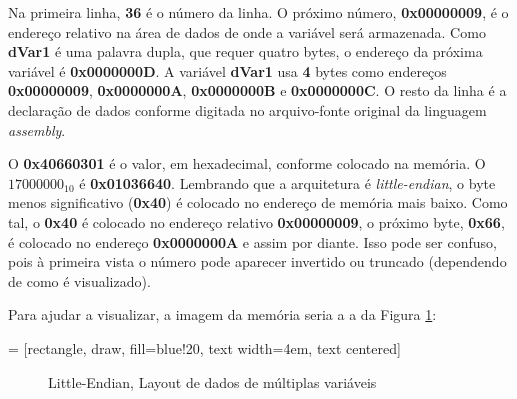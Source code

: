 Na primeira linha, \textbf{36} é o número da linha. O próximo número, \textbf{0x00000009}, é o endereço relativo na área de dados de onde a variável será armazenada. Como \textbf{dVar1} é uma palavra dupla, que requer quatro bytes, o endereço da próxima variável é \textbf{0x0000000D}. A variável \textbf{dVar1} usa \textbf{4} bytes como endereços \textbf{0x00000009}, \textbf{0x0000000A}, \textbf{0x0000000B} e \textbf{0x0000000C}. O resto da linha é a declaração de dados conforme digitada no arquivo-fonte original da linguagem \textit{assembly}.

O \textbf{0x40660301} é o valor, em hexadecimal, conforme colocado na memória. O \textbf{$ 17000000_{10} $}  é \textbf{0x01036640}. Lembrando que a arquitetura é \textit{little-endian}, o byte menos significativo (\textbf{0x40}) é colocado no endereço de memória mais baixo. Como tal, o \textbf{0x40} é colocado no endereço relativo \textbf{0x00000009}, o próximo byte, \textbf{0x66}, é colocado no endereço \textbf{0x0000000A} e assim por diante. Isso pode ser confuso, pois à primeira vista o número pode aparecer invertido ou truncado (dependendo de como é visualizado).

Para ajudar a visualizar, a imagem da memória seria a a da Figura \ref{fig:litllelayout}:

 = [rectangle, draw, fill=blue!20, 
text width=4em, text centered]

\begin{figure}[h]
	\caption{Little-Endian, Layout de dados de múltiplas variáveis}
	\label{fig:litllelayout}
\end{figure}

